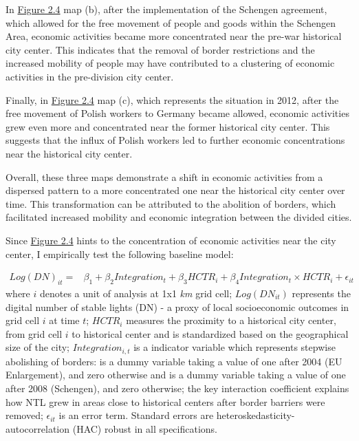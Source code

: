 \documentclass[12pt]{article}    %
\begin{document}
\par In \hyperlink{Figure 2.4}{Figure 2.4} map (b), after the implementation of the Schengen agreement, which allowed for the free movement of people and goods within the Schengen Area, economic activities became more concentrated near the pre-war historical city center. This indicates that the removal of border restrictions and the increased mobility of people may have contributed to a clustering of economic activities in the pre-division city center.

\par Finally, in \hyperlink{Figure 2.4}{Figure 2.4} map (c), which represents the situation in 2012, after the free movement of Polish workers to Germany became allowed, economic activities grew even more and concentrated near the former historical city center. This suggests that the influx of Polish workers led to further economic concentrations near the historical city center.



\par Overall, these three maps demonstrate a shift in economic activities from a dispersed pattern to a more concentrated one near the historical city center over time. This transformation can be attributed to the abolition of borders, which facilitated increased mobility and economic integration between the divided cities.

\par Since \hyperlink{Figure 2.4}{Figure 2.4} hints to the concentration of economic activities near the city center, I empirically test the following baseline model: 

\begin{equation} 
\renewcommand\theequation{2.1}
\begin{split}
Log(DN)_{it}=&\beta_1+\beta_2 Integration_{t}+ \beta _{3} HCTR_{i} + \beta_4  Integration_{t}\times HCTR_{i}+\epsilon_{it}
\end{split}
\end{equation}
where $i$ denotes a unit of analysis at 1x1 \textit{km} grid cell; $ Log(DN_{it})$ represents the digital number of stable lights (DN) -  a proxy of local socioeconomic outcomes in grid cell $i$ at time $t$; $HCTR_{i}$ measures the proximity  to a historical city center, from grid cell $i$ to historical center and is standardized based on the geographical size of the city; $Integration_{i,t}$ is a indicator variable which represents stepwise abolishing of borders: is a dummy variable taking a value of one after 2004 (EU Enlargement), and zero otherwise and is a dummy variable taking a value of one after 2008 (Schengen), and zero otherwise; the key interaction coefficient explains how NTL grew in  areas close to historical centers after border barriers were removed; $\epsilon_{it}$ is an error term. Standard errors are  heteroskedasticity-autocorrelation (HAC) robust in all specifications.
\end{document}
